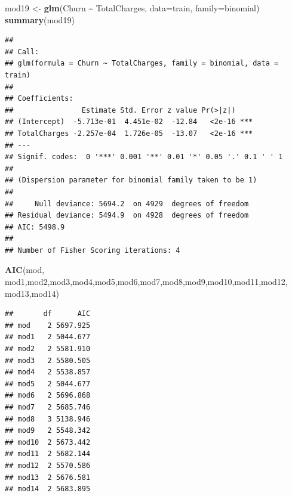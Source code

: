 \documentclass[
  twoside]{article}
\newenvironment{Shaded}{\begin{snugshade}}{\end{snugshade}}
\newcommand{\AttributeTok}[1]{\textcolor[rgb]{0.13,0.29,0.53}{#1}}
\newcommand{\FunctionTok}[1]{\textcolor[rgb]{0.13,0.29,0.53}{\textbf{#1}}}
\newcommand{\NormalTok}[1]{#1}
\newcommand{\OtherTok}[1]{\textcolor[rgb]{0.56,0.35,0.01}{#1}}
\newcommand{\SpecialCharTok}[1]{\textcolor[rgb]{0.81,0.36,0.00}{\textbf{#1}}}
\begin{document}
\begin{Shaded}
\begin{Highlighting}[]
\NormalTok{mod19 }\OtherTok{\textless{}{-}} \FunctionTok{glm}\NormalTok{(Churn }\SpecialCharTok{\textasciitilde{}}\NormalTok{ TotalCharges, }\AttributeTok{data=}\NormalTok{train, }\AttributeTok{family=}\NormalTok{binomial)}
\FunctionTok{summary}\NormalTok{(mod19)}
\end{Highlighting}
\end{Shaded}

\begin{verbatim}
## 
## Call:
## glm(formula = Churn ~ TotalCharges, family = binomial, data = train)
## 
## Coefficients:
##                Estimate Std. Error z value Pr(>|z|)    
## (Intercept)  -5.713e-01  4.451e-02  -12.84   <2e-16 ***
## TotalCharges -2.257e-04  1.726e-05  -13.07   <2e-16 ***
## ---
## Signif. codes:  0 '***' 0.001 '**' 0.01 '*' 0.05 '.' 0.1 ' ' 1
## 
## (Dispersion parameter for binomial family taken to be 1)
## 
##     Null deviance: 5694.2  on 4929  degrees of freedom
## Residual deviance: 5494.9  on 4928  degrees of freedom
## AIC: 5498.9
## 
## Number of Fisher Scoring iterations: 4
\end{verbatim}

\begin{Shaded}
\begin{Highlighting}[]
\FunctionTok{AIC}\NormalTok{(mod, mod1,mod2,mod3,mod4,mod5,mod6,mod7,mod8,mod9,mod10,mod11,mod12, mod13,mod14)}
\end{Highlighting}
\end{Shaded}

\begin{verbatim}
##       df      AIC
## mod    2 5697.925
## mod1   2 5044.677
## mod2   2 5581.910
## mod3   2 5580.505
## mod4   2 5538.857
## mod5   2 5044.677
## mod6   2 5696.868
## mod7   2 5685.746
## mod8   3 5138.946
## mod9   2 5548.342
## mod10  2 5673.442
## mod11  2 5682.144
## mod12  2 5570.586
## mod13  2 5676.581
## mod14  2 5683.895
\end{verbatim}
\end{document}
